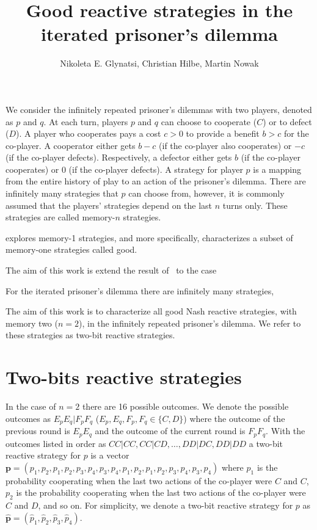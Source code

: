 \documentclass{article}
\title{Good reactive strategies in the iterated prisoner's dilemma}
\author{Nikoleta E. Glynatsi, Christian Hilbe, Martin Nowak}
\date{}
\theoremstyle{definition}
\begin{document}
\maketitle

We consider the infinitely repeated prisoner's dilemmas with two players,
denoted as \(p\) and \(q\). At each turn, players \(p\) and \(q\) can choose to
cooperate (\(C\)) or to defect (\(D\)). A player who cooperates pays a cost \(c
> 0\) to provide a benefit \(b > c\) for the co-player. A cooperator either gets
\(b - c\) (if the co-player also cooperates) or \(-c\) (if the co-player
defects). Respectively, a defector either gets \(b\) (if the co-player
cooperates) or 0 (if the co-player defects). A strategy for player \(p\) is a
mapping from the entire history of play to an action of the prisoner's dilemma.
There are infinitely many strategies that \(p\) can choose from, however, it is
commonly assumed that the players' strategies depend on the last \(n\) turns
only. These strategies are called memory-\(n\) strategies.

\citep{akin:EGADS:2016} explores memory-1 strategies, and more specifically,
characterizes a subset of memory-one strategies called good.

The aim of this work is extend the result of~\citep{akin:EGADS:2016} to the case


For the iterated prisoner's dilemma
there are infinitely many strategies,

The aim of this work is to characterize all good Nash reactive strategies, with
memory two (\(n=2\)), in the infinitely repeated prisoner's dilemma. We refer to
these strategies as two-bit reactive strategies.

\section{Two-bits reactive strategies}

In the case of \(n=2\) there are 16 possible outcomes. We denote the possible
outcomes as \(E_p E_q | F_p F_q\) (\(E_p, E_q, F_p, F_q \in \{C, D\}\)) where
the outcome of the previous round is \(E_p E_q\) and the outcome of the current
round is \(F_p F_q\). With the outcomes listed in order as \(CC|CC, CC|CD,
\dots, DD|DC, DD|DD\)  a two-bit reactive strategy for \(p\) is a vector
\(\mathbf{p} = (p_1, p_2, p_1, p_2, p_3, p_4, p_3, p_4, p_1, p_2, p_1, p_2, p_3,
p_4, \allowbreak p_3, p_4)\) where \(p_1\) is the probability cooperating when
the last two actions of the co-player were \(C\) and \(C\), \(p_2\) is the
probability cooperating when the last two actions of the co-player were \(C\)
and \(D\), and so on. For simplicity, we denote a two-bit reactive strategy for
\(p\) as \(\mathbf{\hat{p}} = (\hat{p}_1, \hat{p}_2, \hat{p}_3, \hat{p}_4)\).
\end{document}
